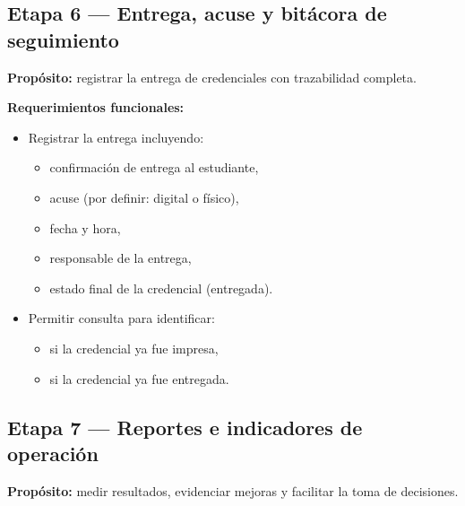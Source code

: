 \documentclass[12pt,a4paper]{article}
\begin{document}
\subsection{Etapa 6 --- Entrega, acuse y bitácora de seguimiento}
\textbf{Propósito:} registrar la entrega de credenciales con trazabilidad completa.

\textbf{Requerimientos funcionales:}
\begin{itemize}
  \item Registrar la entrega incluyendo:
  \begin{itemize}
    \item confirmación de entrega al estudiante,
    \item acuse (por definir: digital o físico),
    \item fecha y hora,
    \item responsable de la entrega,
    \item estado final de la credencial (entregada).
  \end{itemize}
  \item Permitir consulta para identificar:
  \begin{itemize}
    \item si la credencial ya fue impresa,
    \item si la credencial ya fue entregada.
  \end{itemize}
\end{itemize}

\subsection{Etapa 7 --- Reportes e indicadores de operación}
\textbf{Propósito:} medir resultados, evidenciar mejoras y facilitar la toma de decisiones.
\end{document}
